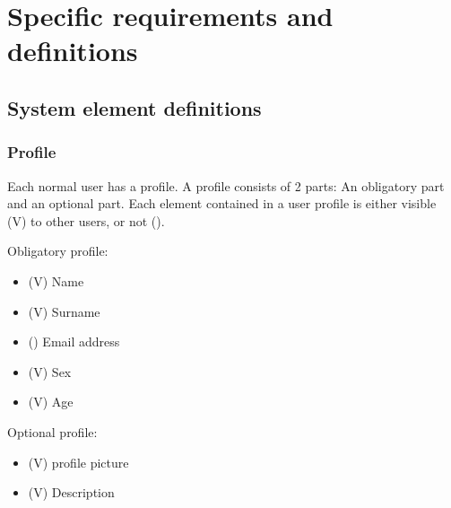 \documentclass[a4wide]{article}
\begin{document}
\section{Specific requirements and definitions}
\subsection{System element definitions}
\subsubsection{Profile}
Each normal user has a profile. 
A profile consists of 2 parts: An obligatory part and an optional part.
Each element contained in a user profile is either visible (V) to other users, or not ().

Obligatory profile:
\begin{itemize}
\item (V) Name
\item (V) Surname
\item () Email address
\item (V) Sex
\item (V) Age
\end{itemize}
Optional profile:
\begin{itemize}
\item (V) profile picture
\item (V) Description
\end{itemize}
\end{document}
